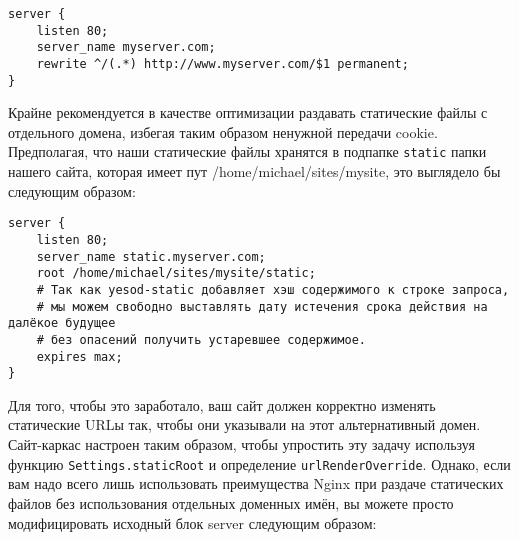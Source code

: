\begin{lstlisting}
server {
    listen 80;
    server_name myserver.com;
    rewrite ^/(.*) http://www.myserver.com/$1 permanent;
}
\end{lstlisting}%
%
%

Крайне рекомендуется в качестве оптимизации раздавать статические файлы с отдельного домена, избегая таким образом ненужной передачи cookie. Предполагая, что наши статические файлы хранятся в подпапке \lstinline{static} папки нашего сайта, которая имеет пут /home/michael/sites/mysite, это выглядело бы следующим образом:

%
\begin{lstlisting}
server {
    listen 80;
    server_name static.myserver.com;
    root /home/michael/sites/mysite/static;
    # Так как yesod-static добавляет хэш содержимого к строке запроса,
    # мы можем свободно выставлять дату истечения срока действия на далёкое будущее
    # без опасений получить устаревшее содержимое.
    expires max;
}
\end{lstlisting}
%

Для того, чтобы это заработало, ваш сайт должен корректно изменять статические URLы так, чтобы они указывали на этот альтернативный домен. Сайт-каркас настроен таким образом, чтобы упростить эту задачу используя функцию \lstinline{Settings.staticRoot} и определение \lstinline{urlRenderOverride}. Однако, если вам надо всего лишь использовать преимущества Nginx при раздаче статических файлов без использования отдельных доменных имён, вы можете просто модифицировать исходный блок server следующим образом:
%
%
 
